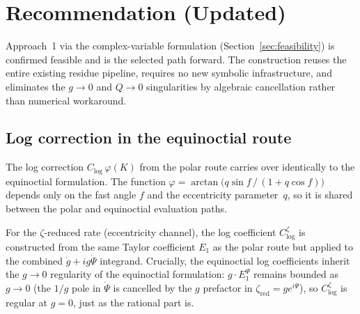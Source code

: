 \documentclass[11pt]{article}
\begin{document}
\section{Recommendation (Updated)}

Approach~1 via the complex-variable formulation
(Section~\ref{sec:feasibility}) is confirmed feasible and is the selected
path forward. The construction reuses the entire existing residue pipeline,
requires no new symbolic infrastructure, and eliminates the $g \to 0$ and
$Q \to 0$ singularities by algebraic cancellation rather than numerical
workaround.

\subsection*{Log correction in the equinoctial route}

The log correction $C_{\log}\,\varphi(K)$ from the polar route carries
over identically to the equinoctial formulation.  The function
$\varphi = \arctan\!\bigl(q\sin f\,/\,(1 + q\cos f)\bigr)$ depends only
on the fast angle $f$ and the eccentricity parameter~$q$, so it is shared
between the polar and equinoctial evaluation paths.

For the $\zeta$-reduced rate (eccentricity channel), the log coefficient
$C_{\log}^{\zeta}$ is constructed from the same Taylor coefficient $E_1$
as the polar route but applied to the combined
$\dot g + ig\dot\Psi$ integrand.  Crucially, the equinoctial log
coefficients inherit the $g \to 0$ regularity of the equinoctial
formulation: $g \cdot E_1^{\Psi}$ remains bounded as $g \to 0$ (the $1/g$
pole in $\dot\Psi$ is cancelled by the $g$ prefactor in
$\zeta_{\mathrm{red}} = g e^{i\Psi}$), so $C_{\log}^{\zeta}$ is regular
at $g = 0$, just as the rational part is.
\end{document}
